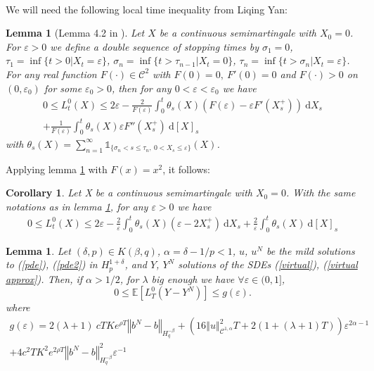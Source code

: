\documentclass[12pt]{article}
\newtheorem{lem}[theo]{Lemma}
\newtheorem{cor}[theo]{Corollary}
\newcommand{\norme}[1]{\left\Vert #1\right\Vert}
\newcommand{\E}{\mathbb{E}}
\newcommand{\di}{\mathrm{d}}
\begin{document}
        \paragraph{}
        We will need the following local time inequality from Liqing Yan:        
        \begin{lem}[Lemma 4.2 in \cite{Yan}]\label{local}
            Let $X$ be a continuous semimartingale with $X_0 = 0$. For $\varepsilon>0$ we define a double sequence of stopping times by $\sigma_1 = 0$, $\tau_1=\inf\{t>0 | X_t=\varepsilon\}$, $\sigma_n = \inf\{t>\tau_{n-1}|X_t=0\}$, $\tau_n=\inf\{t>\sigma_n|X_t=\varepsilon\}$. For any real function $F(\cdot)\in\mathcal{C}^2$ with $F(0)=0,\ F'(0) = 0$ and $F(\cdot) > 0$ on $(0,\varepsilon_0)$ for some $\varepsilon_0 > 0$, then for any $0<\varepsilon<\varepsilon_0$ we have
            \begin{multline*}
                0\leq L^0_t(X) \leq 2\varepsilon - \frac{2}{F(\varepsilon)}\int_0^t \theta_s(X) \left(F\left(\varepsilon\right) - \varepsilon F'\left(X_s^+\right)\right)\ \di X_s\\
                +\frac{1}{F(\varepsilon)}\int_0^t \theta_s(X)\varepsilon F''(X_s^+)\ \di[X]_s
            \end{multline*}
            with $\theta_s(X) = \sum_{n=1}^\infty \mathds{1}_{\{\sigma_n< s\leq \tau_n,\ 0<X_s\leq \varepsilon\}}(X)$.
        \end{lem}        
        Applying lemma \ref{local} with $F(x) = x^2$, it follows:
        \begin{cor}\label{cor}
            Let X be a continuous semimartingale with $X_0 = 0$. With the same notations as in lemma \ref{local}, for any $\varepsilon>0$ we have
            \begin{multline}
                0\leq L^0_t(X) \leq 2\varepsilon - \frac{2}{\varepsilon}\int_0^t \theta_s(X) \left(\varepsilon - 2{X_s^+}\right)\ \di X_s
                +\frac{2}{\varepsilon}\int_0^t \theta_s(X) \ \di[X]_s
            \end{multline}
        \end{cor}

\begin{lem}\label{local time}
    Let $(\delta,p)\in K(\beta,q)$, $\alpha=\delta-1/p<1$, $u$, $u^N$ be the mild solutions to (\ref{pde}), (\ref{pde2}) in $H_p^{1+\delta}$, and $Y$, $Y^N$ solutions of the SDEs (\ref{virtual}), (\ref{virtual approx}).  Then, if $\alpha>1/2$, for $\lambda$ big enough we have $\forall\varepsilon\in(0,1]$,
    \begin{equation*}
    0\leq \E\left[L^0_T(Y-Y^N)\right]\leq  g(\varepsilon).
    \end{equation*}
    where \begin{multline*}
    g(\varepsilon) = 2(\lambda + 1)\ cT Ke^{\rho T}\norme{b^N-b}_{H^{-\beta}_{q}} + \left(16\norme{u}_{\mathcal{C}^{1,\alpha}}^2 T + 2(1+(\lambda + 1)T)\right) \varepsilon^{2\alpha-1}\\
    + 4c^2T K^2e^{2\rho T}\norme{b^N-b}_{H^{-\beta}_{q}}^2\varepsilon^{-1}
    \end{multline*}
\end{lem}
\end{document}
